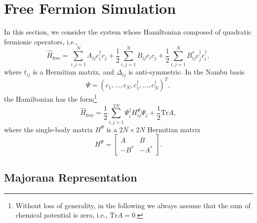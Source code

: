 \documentclass[aps,prb,superscriptaddress,nofootinbib]{revtex4}
\begin{document}
\section{Free Fermion Simulation}

In this section, we consider the system whose Hamiltonian composed of quadratic fermionic operators, i.e.,
\begin{equation}
	\hat H_{\mathrm{free}} = \sum_{i,j=1}^N A_{ij} c_i^\dagger c_j + \frac{1}{2}\sum_{i,j=1}^N B_{ij} c_i c_j + \frac{1}{2}\sum_{i,j=1}^N B_{ij}^* c_j^\dagger c_i^\dagger, \label{eq:lattice-free-fermion-hamiltonian}
\end{equation}
where $t_{ij}$ is a Hermitian matrix, and $\Delta_{ij}$ is anti-symmetric.
In the Nambu basis 
\begin{equation}
	\Psi = (c_1,\dots,c_N,c_1^\dagger,\dots,c_N^\dagger)^T,
\end{equation}
the Hamiltonian has the form\footnote{Without loss of generality, in the following we always assume that the sum of chemical potential is zero, i.e., $\mathrm{Tr} A=0$.}
\begin{equation}
	\hat H_{\mathrm{free}} = \frac{1}{2} \sum_{i,j=1}^{2N} \Psi^\dagger_i H_{ij}^{\Psi} \Psi_j + \frac{1}{2}\mathrm{Tr}A,
\end{equation}
where the single-body matrix $H^{\Psi}$ is a $2N\times 2N$ Hermitian matrix
\begin{equation}
	H^{\Psi} = \left[\begin{array}{cc} 
		A & B \\
		-B^* & -A^* 
	\end{array}\right].
\end{equation}

\subsection{Majorana Representation}
\end{document}

